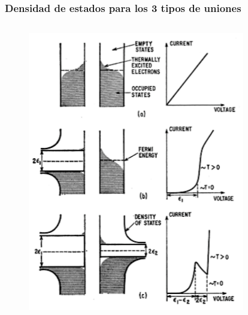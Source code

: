 \begin{frame}
\frametitle{Densidad de estados para los 3 tipos de uniones}

\begin{columns}
\begin{column}{0.5\textwidth}
	\begin{figure}[!h] \label{fermi_levels}
	\includegraphics[width=\textwidth]{fermi_levels}
	\end{figure}
\end{column}
\begin{column}{0.5\textwidth}
	\begin{figure}[!h] \label{fermi_levels2}

\end{figure}
\end{column}
\end{columns}
\end{frame}
